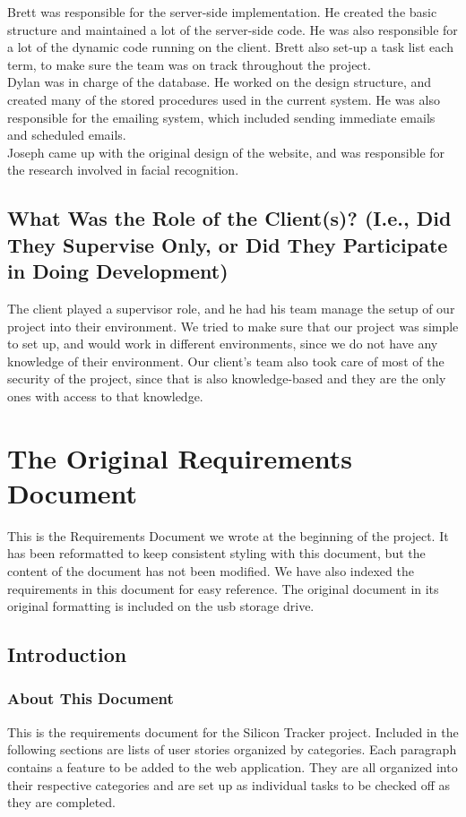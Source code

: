 \documentclass[10pt, onecolumn, twoside, peerreview]{IEEEtran}
\begin{document}
Brett was responsible for the server-side implementation. He created the basic structure and maintained a lot of the server-side code. He was also responsible for a lot of the dynamic code running on the client. Brett also set-up a task list each term, to make sure the team was on track throughout the project.\\

Dylan was in charge of the database. He worked on the design structure, and created many of the stored procedures used in the current system. He was also responsible for the emailing system, which included sending immediate emails and scheduled emails.\\

Joseph came up with the original design of the website, and was responsible for the research involved in facial recognition.

\subsection{What Was the Role of the Client(s)? (I.e., Did They Supervise Only, or Did They Participate in Doing Development)}
The client played a supervisor role, and he had his team manage the setup of our project into their environment. We tried to make sure that our project was simple to set up, and would work in different environments, since we do not have any knowledge of their environment. Our client's team also took care of most of the security of the project, since that is also knowledge-based and they are the only ones with access to that knowledge.


\section{The Original Requirements Document}
This is the Requirements Document we wrote at the beginning of the
project. It has been reformatted to keep consistent styling with this document, but the content of the document has
not been modified. We have also indexed the requirements in this document for easy reference. The original document in its original formatting is included on the usb storage drive.
\subsection{Introduction}

\subsubsection{About This Document}
This is the requirements document for the Silicon Tracker project. Included in the following sections are lists of user
stories organized by categories. Each paragraph contains a feature to be added to the web application. They are all
organized into their respective categories and are set up as individual tasks to be checked off as they are
completed.\\
\end{document}
